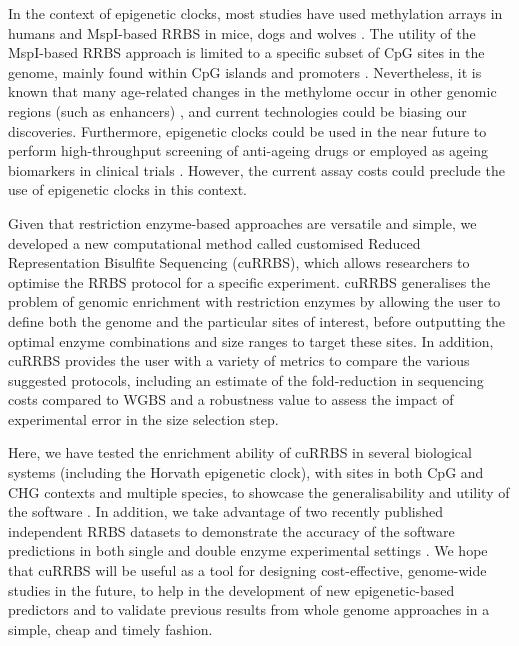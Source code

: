 \bigskip

In the context of epigenetic clocks, most studies have used methylation arrays in humans \cite{Koch2011,Horvath2013,Hannum2013} and MspI-based RRBS in mice, dogs and wolves \cite{Stubbs2017,Petkovich2017,Thompson2018,Meer2018,Thompson2017}. The utility of the MspI-based RRBS approach is limited to a specific subset of CpG sites in the genome, mainly found within CpG islands and promoters \cite{Meissner2008}. Nevertheless, it is known that many age-related changes in the methylome occur in other genomic regions (such as enhancers) \cite{Slieker2016,Slieker2018,Cole2017}, and current technologies could be biasing our discoveries. Furthermore, epigenetic clocks could be used in the near future to perform high-throughput screening of anti-ageing drugs or employed as ageing biomarkers in clinical trials \cite{Horvath2018a}. However, the current assay costs could preclude the use of epigenetic clocks in this context.

\bigskip 

Given that restriction enzyme-based approaches are versatile and simple, we developed a new computational method called customised Reduced Representation Bisulfite Sequencing (\acrshort{cuRRBS}), which allows researchers to optimise the RRBS protocol for a specific experiment. cuRRBS generalises the problem of genomic enrichment with restriction enzymes by allowing the user to define both the genome and the particular sites of interest, before outputting the optimal enzyme combinations and size ranges to target these sites. In addition, cuRRBS provides the user with a variety of metrics to compare the various suggested protocols, including an estimate of the fold-reduction in sequencing costs compared to WGBS and a robustness value to assess the impact of experimental error in the size selection step.

\bigskip

Here, we have tested the enrichment ability of cuRRBS in several biological systems (including the Horvath epigenetic clock), with sites in both CpG and \acrshort{CHG} contexts and multiple species, to showcase the generalisability and utility of the software \cite{Horvath2013,Hanna2016,Milagre2017,Kawakatsu2016,Maurano2015,LevMaor2015,Domcke2015}. In addition, we take advantage of two recently published independent RRBS datasets to demonstrate the accuracy of the software predictions in both single and double enzyme experimental settings \cite{Tanas2017,Lim2016}. We hope that cuRRBS will be useful as a tool for designing cost-effective, genome-wide studies in the future, to help in the development of new epigenetic-based predictors and to validate previous results from whole genome approaches in a simple, cheap and timely fashion.


